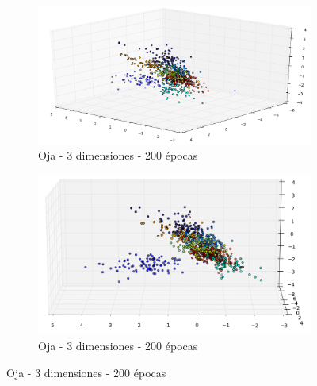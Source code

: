 \begin{figure}[!htbp]
\centering
\begin{subfigure}{.5\textwidth}
  \centering
  \includegraphics[width=1\linewidth, scale=1]{../img/ej1/oja/oja_3salida_200ep_train.png}
  \caption{Oja - 3 dimensiones - 200 épocas}
  \label{fig:sub1}
\end{subfigure}%
\begin{subfigure}{.5\textwidth}
  \centering
  \includegraphics[width=1\linewidth, scale=1]{../img/ej1/oja/oja_3salida_200ep_train_2.png}
  \caption{Oja - 3 dimensiones - 200 épocas}
  \label{fig:sub2}
\end{subfigure}
\end{figure}
